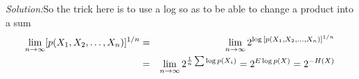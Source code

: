 \documentclass[12pt]{article}
\newcommand{\soln}{\noindent\textit{Solution:}}
\begin{document}
\begin{enumerate}
\soln So the trick here is to use a log so as to be able to change a product into a sum
\begin{eqnarray}
\lim_{n\rightarrow \infty}[p(X_1,X_2,\ldots,X_n)]^{1/n}&=&\lim_{n\rightarrow \infty}2^{\log{[p(X_1,X_2,\ldots,X_n)]^{1/n}}}\cr
&=&\lim_{n\rightarrow \infty}2^{\frac{1}{n}\sum\log{p(X_i)}}=2^{E\log{p(X)}}=2^{-H(X)}
\end{eqnarray}


\end{enumerate}
\end{document}
